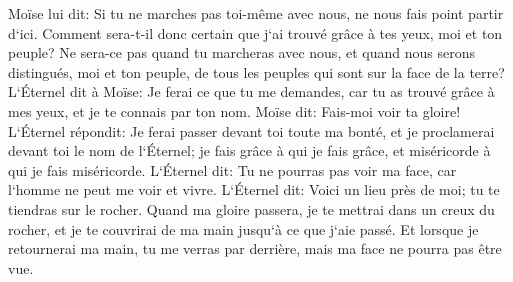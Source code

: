 \verse Moïse lui dit: Si tu ne marches pas toi-même avec nous, ne nous fais point partir d`ici. 
\verse Comment sera-t-il donc certain que j`ai trouvé grâce à tes yeux, moi et ton peuple? Ne sera-ce pas quand tu marcheras avec nous, et quand nous serons distingués, moi et ton peuple, de tous les peuples qui sont sur la face de la terre? 
\verse L`Éternel dit à Moïse: Je ferai ce que tu me demandes, car tu as trouvé grâce à mes yeux, et je te connais par ton nom. 
\verse Moïse dit: Fais-moi voir ta gloire! 
\verse L`Éternel répondit: Je ferai passer devant toi toute ma bonté, et je proclamerai devant toi le nom de l`Éternel; je fais grâce à qui je fais grâce, et miséricorde à qui je fais miséricorde. 
\verse L`Éternel dit: Tu ne pourras pas voir ma face, car l`homme ne peut me voir et vivre. 
\verse L`Éternel dit: Voici un lieu près de moi; tu te tiendras sur le rocher. 
\verse Quand ma gloire passera, je te mettrai dans un creux du rocher, et je te couvrirai de ma main jusqu`à ce que j`aie passé. 
\verse Et lorsque je retournerai ma main, tu me verras par derrière, mais ma face ne pourra pas être vue. 

\chapter{}

